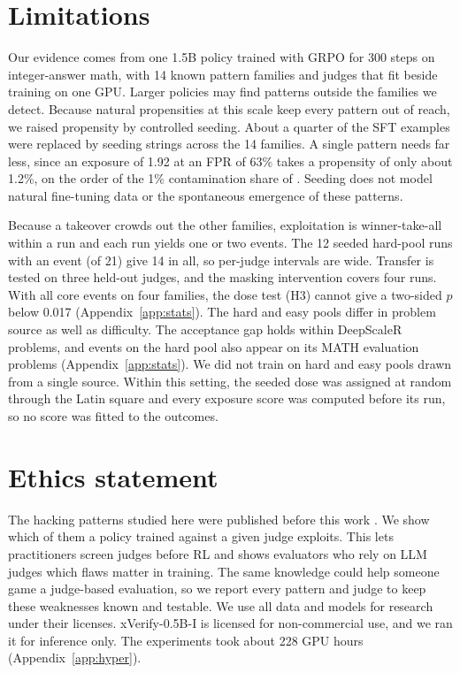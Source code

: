 \documentclass[11pt]{article}
\begin{document}
\section*{Limitations}

Our evidence comes from one 1.5B policy trained with GRPO for 300 steps on integer-answer math, with 14 known pattern
families and judges that fit beside training on one GPU. Larger policies may find patterns outside the families we
detect. Because natural propensities at this scale keep every pattern out of reach, we raised propensity by controlled
seeding. About a quarter of the SFT examples were replaced by seeding strings across the 14 families. A single pattern
needs far less, since an exposure of 1.92 at an FPR of 63\% takes a propensity of only about 1.2\%, on the order of
the 1\% contamination share of \citet{khalifa2026countdown}. Seeding does not model natural fine-tuning data or
the spontaneous emergence of these patterns.

Because a takeover crowds out the other families, exploitation is winner-take-all within a run and each run yields
one or two events. The 12 seeded hard-pool runs with an event (of 21) give 14 in all, so per-judge intervals are
wide. Transfer is tested on three held-out judges, and the masking intervention covers four runs. With all core
events on four families, the dose test (H3) cannot give a two-sided $p$ below 0.017 (Appendix~\ref{app:stats}). The
hard and easy pools differ in problem source as well as difficulty. The acceptance gap holds within DeepScaleR
problems, and events on the hard
pool also appear on its MATH evaluation problems (Appendix~\ref{app:stats}). We
did not train on hard and easy pools drawn from a single source. Within this setting, the seeded dose was assigned
at random through the Latin square and every exposure score was computed before its run, so no score was fitted to
the outcomes.

\section*{Ethics statement}

The hacking patterns studied here were published before this work \citep{huang2025accuracy, zhao2025onetoken}. We
show which of them a policy trained against a given judge exploits. This lets practitioners screen judges before RL
and shows evaluators who rely on LLM judges which flaws matter in training. The same knowledge could help someone
game a judge-based evaluation, so we report every pattern and judge to keep these weaknesses known and testable. We
use all data and models for research under their licenses. xVerify-0.5B-I is licensed for non-commercial use, and
we ran it for inference only. The experiments took about 228 GPU hours (Appendix~\ref{app:hyper}).
\end{document}

